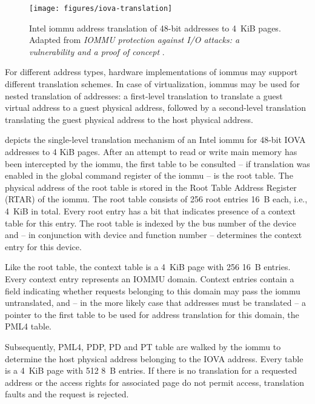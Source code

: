 \begin{figure}[!b]
    \centering
    \texttt{[image: figures/iova-translation]}
    \caption{Intel \acs{iommu} address translation of 48-bit addresses to 4~KiB
    pages. Adapted from \textit{IOMMU protection against I/O attacks: a
    vulnerability and a proof of concept} \cite{morgan2018iommu}.}
    \label{fig:translation}
\end{figure}

For different address types, hardware implementations of \acp{iommu} may support
different translation schemes. In case of virtualization, \acp{iommu} may be
used for nested translation of addresses: a first-level translation to translate
a guest virtual address to a guest physical address, followed by a second-level
translation translating the guest physical address to the host physical address.

 depicts the single-level translation mechanism of an
Intel \ac{iommu} for 48-bit IOVA addresses to 4 KiB pages. After an attempt to
read or write main memory has been intercepted by the \ac{iommu}, the first
table to be consulted -- if translation was enabled in the global command
register of the \ac{iommu} -- is the root table. The physical address of the
root table is stored in the Root Table Address Register (RTAR) of the
\ac{iommu}. The root table consists of 256 root entries 16~B each, i.e., 4~KiB
in total. Every root entry has a bit that indicates presence of a context table
for this entry. The root table is indexed by the bus number of the device and --
in conjunction with device and function number -- determines the context entry
for this device.

Like the root table, the context table is a 4~KiB page with 256 16~B entries.
Every context entry represents an IOMMU domain. Context entries contain a field
indicating whether requests belonging to this domain may pass the \ac{iommu}
untranslated, and -- in the more likely case that addresses must be translated
-- a pointer to the first table to be used for address translation for this
domain, the PML4 table.

Subsequently, PML4, PDP, PD and PT table are walked by the \ac{iommu} to
determine the host physical address belonging to the IOVA address. Every table
is a 4~KiB page with 512 8~B entries. If there is no translation for a requested
address or the access rights for associated page do not permit access,
translation faults and the request is rejected.

